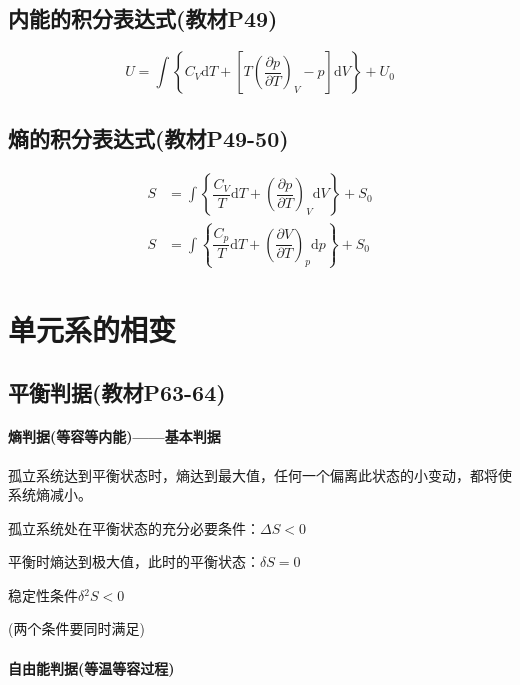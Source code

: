 \documentclass[oneside]{ctexbook}
\begin{document}
\section{内能的积分表达式(教材P49)}
\begin{equation}
U=\int\left\lbrace{}C_V\mathrm{d}T+\left[T\left(\dfrac{\partial{}p}{\partial{}T}\right)_V-p\right]\mathrm{d}V\right\rbrace+U_0
\end{equation}

\section{熵的积分表达式(教材P49-50)}
\begin{equation}
\begin{aligned}
    S&=\int\left\lbrace{}\dfrac{C_V}{T}\mathrm{d}T+\left(\dfrac{\partial{}p}{\partial{}T}\right)_V\mathrm{d}V\right\rbrace+S_0\\
    S&=\int\left\lbrace{}\dfrac{C_p}{T}\mathrm{d}T+\left(\dfrac{\partial{}V}{\partial{}T}\right)_p\mathrm{d}p\right\rbrace+S_0
\end{aligned}
\end{equation}

\chapter{单元系的相变}

\section{平衡判据(教材P63-64)}

\subsubsection{熵判据(等容等内能)——基本判据}

孤立系统达到平衡状态时，熵达到最大值，任何一个偏离此状态的小变动，都将使系统熵减小。

孤立系统处在平衡状态的充分必要条件：\(\Delta{}S<0\)

平衡时熵达到极大值，此时的平衡状态：\(\delta{}S=0\)

稳定性条件\(\delta{}^2S<0\)

(两个条件要同时满足)

\subsubsection{自由能判据(等温等容过程)}
\end{document}
